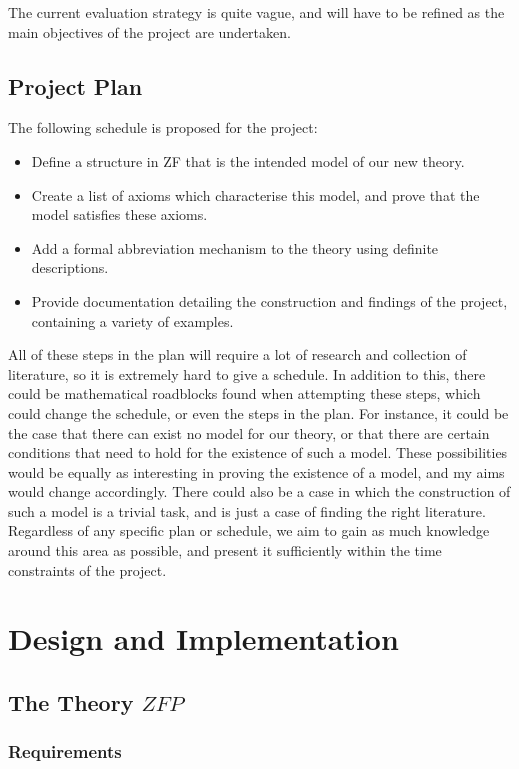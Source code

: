 \documentclass[11pt]{report}
\theoremstyle{definition}
\theoremstyle{theorem}
\theoremstyle{lemma}
\begin{document}
The current evaluation strategy is quite vague, and will have to be refined as the main objectives of the project are undertaken.

\section{Project Plan}
The following schedule is proposed for the project:
\begin{itemize}
\item Define a structure in ZF that is the intended model of our new theory.
\item Create a list of axioms which characterise this model, and prove that the model satisfies these axioms.
\item Add a formal abbreviation mechanism to the theory using definite descriptions.
\item Provide documentation detailing the construction and findings of the project, containing a variety of examples.
\end{itemize}
All of these steps in the plan will require a lot of research and collection of literature, so it is extremely hard to give a schedule.
In addition to this, there could be mathematical roadblocks found when attempting these steps, which could change the schedule, or even the steps in the plan.
For instance, it could be the case that there can exist no model for our theory, or that there are certain conditions that need to hold for the existence of such a model.
These possibilities would be equally as interesting in proving the existence of a model, and my aims would change accordingly.
There could also be a case in which the construction of such a model is a trivial task, and is just a case of finding the right literature.
Regardless of any specific plan or schedule, we aim to gain as much knowledge around this area  as possible, and present it sufficiently within the time constraints of the project.

\chapter{Design and Implementation}
\section{The Theory $\mathit{ZFP}$}
\subsection{Requirements}\label{zfpreq}
\end{document}
